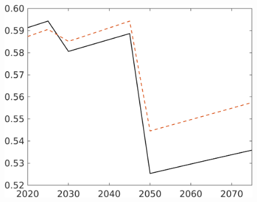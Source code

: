 \begin{figure}[h!!]
\begin{minipage}[]{0.32\textwidth}
\end{minipage}
\begin{minipage}[]{0.32\textwidth}
	\includegraphics[width=1\textwidth]{../../codding_model/own_basedOnFried/optimalPol_elastS_DisuSci/figures/all_1705/comp_notaul_OPT_T_NoTaus_N_spillover0_sep1_BN0_ineq0_etaa0.79.png}
\end{minipage}
\end{figure} 
%

